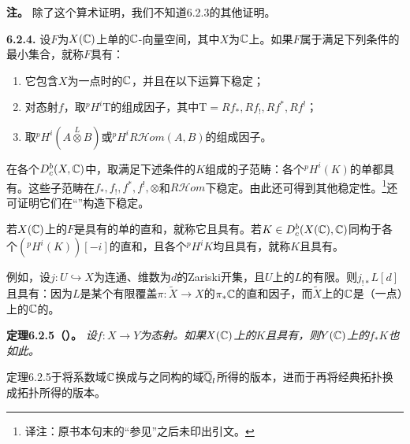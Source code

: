 \noindent\textbf{注。} 除了这个算术证明，我们不知道6.2.3的其他证明。

\par\medskip\noindent\textbf{6.2.4.} 设$F$为$X(\mathbb C)$上单的$\mathbb C$-向量空间，其中$X$为$\mathbb C$上。如果$F$属于满足下列条件的最小集合，就称$F$具有：
\begin{enumerate}[label=(\alph*)]
\item 它包含$X$为一点时的$\mathbb C$，并且在以下运算下稳定；
\item 对态射$f$，取${}^pH^i\mathrm T$的组成因子，其中$\mathrm T=Rf_*,Rf_!,Rf^*,Rf^!$；
\item 取${}^pH^i(A\overset L\otimes B)$或${}^pH^iR\mathcal Hom(A,B)$的组成因子。
\end{enumerate}
在各个$D_c^b(X,\mathbb C)$中，取满足下述条件的$K$组成的子范畴：各个${}^pH^i(K)$的单都具有。这些子范畴在$f_*,f_!,f^*,f^!,\otimes$和$R\mathcal Hom$下稳定。由此还可得到其他稳定性。\footnote{译注：原书本句末的“参见”之后未印出引文。}还可证明它们在“”构造下稳定。

若$X(\mathbb C)$上的$F$是具有的单的直和，就称它且具有。若$K\in D_c^b(X(\mathbb C),\mathbb C)$同构于各个$({}^pH^i(K))[-i]$的直和，且各个${}^pH^iK$均且具有，就称$K$且具有。

例如，设$j:U\hookrightarrow X$为连通、维数为$d$的Zariski开集，且$U$上的$L$的有限。则$j_{!*}L[d]$且具有：因为$L$是某个有限覆盖$\pi:\widetilde X\to X$的$\pi_*\mathbb C$的直和因子，而$\widetilde X$上的$\mathbb C$是（一点）上的$\mathbb C$的。

\par\medskip\noindent\textbf{定理6.2.5（）。} \emph{设$f:X\to Y$为态射。如果$X(\mathbb C)$上的$K$且具有，则$Y(\mathbb C)$上的$f_*K$也如此。}

定理6.2.5于将系数域$\mathbb C$换成与之同构的域$\overline{\mathbb Q}_l$所得的版本，进而于再将经典拓扑换成拓扑所得的版本。

